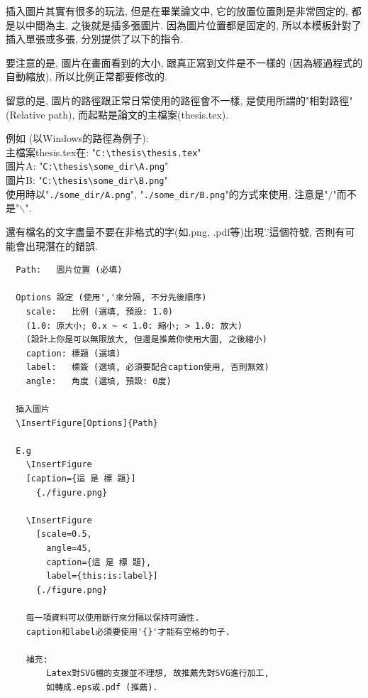 

插入圖片其實有很多的玩法, 但是在畢業論文中, 它的放置位置則是非常固定的, 都是以中間為主, 之後就是插多張圖片. 因為圖片位置都是固定的, 所以本模板針對了插入單張或多張, 分別提供了以下的指令.

要注意的是, 圖片在畫面看到的大小, 跟真正寫到文件是不一樣的 (因為經過程式的自動縮放), 所以比例正常都要修改的.

留意的是, 圖片的路徑跟正常日常使用的路徑會不一樣, 是使用所謂的"相對路徑" (Relative path), 而起點是論文的主檔案(thesis.tex).

\noindent 例如 (以Windows的路徑為例子):\\
主檔案thesis.tex在: "\verb|C:\thesis\thesis.tex|"\\
圖片A: "\verb|C:\thesis\some_dir\A.png|"\\
圖片B: "\verb|C:\thesis\some_dir\B.png|"\\
使用時以"\verb|./some_dir/A.png|", "\verb|./some_dir/B.png|"的方式來使用, 注意是"$/$"而不是"$\backslash$".

還有檔名的文字盡量不要在非格式的字(如.png, .pdf等)出現'.'這個符號, 否則有可能會出現潛在的錯誤.
\newpage
{}
  \EmptyLine
  \begin{fmpage}{\textwidth}
  \begin{verbatim}
  Path:   圖片位置 (必填)

  Options 設定 (使用','來分隔, 不分先後順序)
    scale:   比例 (選填, 預設: 1.0)
    (1.0: 原大小; 0.x ~ < 1.0: 縮小; > 1.0: 放大)
    (設計上你是可以無限放大, 但還是推薦你使用大圖, 之後縮小)
    caption: 標題 (選填)
    label:   標簽 (選填, 必須要配合caption使用, 否則無效)
    angle:   角度 (選填, 預設: 0度)

  插入圖片
  \InsertFigure[Options]{Path}

  E.g
    \InsertFigure
    [caption={這 是 標 題}]
      {./figure.png}

    \InsertFigure
      [scale=0.5,
        angle=45,
        caption={這 是 標 題},
        label={this:is:label}]
      {./figure.png}

    每一項資料可以使用斷行來分隔以保持可讀性.
    caption和label必須要使用'{}'才能有空格的句子.

    補充:
        Latex對SVG檔的支援並不理想, 故推薦先對SVG進行加工,
        如轉成.eps或.pdf (推薦).
  \end{verbatim}
  \end{fmpage}


